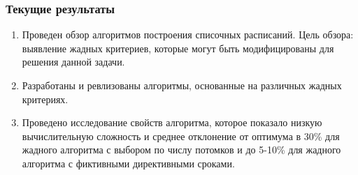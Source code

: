 \begin{frame}
    \frametitle{Текущие результаты}
    \begin{enumerate}
        \item Проведен обзор алгоритмов построения списочных расписаний. Цель обзора: выявление жадных критериев, которые могут быть модифицированы для решения данной задачи.
        \item Разработаны и ревлизованы алгоритмы, основанные на различных жадных критериях.
        \item Проведено исследование свойств алгоритма, которое показало низкую вычислительную сложность и среднее отклонение от оптимума в 30\% для жадного алгоритма с выбором по числу потомков и до 5-10\% для жадного алгоритма с фиктивными директивными сроками. 
    \end{enumerate}
\end{frame}